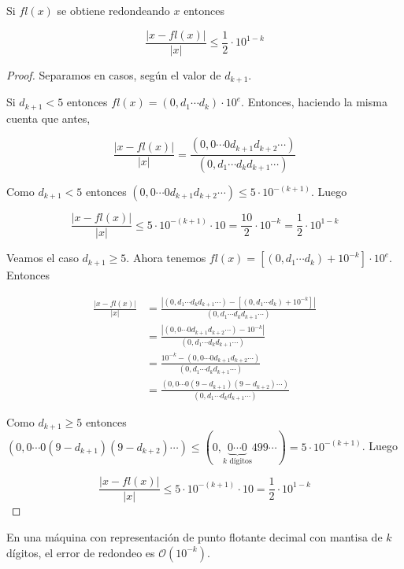 \begin{propo}
\label{propo:er}
Si $fl(x)$ se obtiene redondeando $x$ entonces

\[\frac{|x - fl(x)|}{|x|} \leq \frac{1}{2} \cdot 10^{1 - k}\]

\begin{proof}
Separamos en casos, según el valor de $d_{k + 1}$.

Si $d_{k + 1} < 5$ entonces $fl(x) = (0,d_1 \cdots d_k) \cdot 10^e$. Entonces, haciendo la misma cuenta que antes,

\[\frac{|x - fl(x)|}{|x|} = \frac{(0,0\cdots 0 d_{k + 1} d_{k + 2} \cdots )}{(0,d_1 \cdots d_k d_{k + 1} \cdots)}\]

Como $d_{k + 1} < 5$ entonces $(0,0\cdots 0 d_{k + 1} d_{k + 2} \cdots) \leq 5 \cdot 10^{-(k + 1)}$. Luego

\[\frac{|x - fl(x)|}{|x|} \leq 5 \cdot 10^{-(k + 1)} \cdot 10 = \frac{10}{2} \cdot 10^{-k} = \frac{1}{2} \cdot 10^{1 - k}\]

Veamos el caso $d_{k + 1} \geq 5$. Ahora tenemos $fl(x) = [(0, d_1 \cdots d_k) + 10^{-k}] \cdot 10^e$. Entonces

\begin{align*}
\frac{|x - fl(x)|}{|x|} &= \frac{|(0,d_1\cdots d_k d_{k + 1}\cdots) - [(0,d_1\cdots d_k) + 10^{-k}]|}{(0,d_1\cdots d_k d_{k + 1} \cdots)}\\
&= \frac{|(0,0\cdots 0d_{k + 1}d_{k + 2}\cdots) - 10^{-k}|}{(0,d_1\cdots d_k d_{k + 1} \cdots)}\\
&= \frac{10^{-k} - (0,0\cdots 0d_{k + 1}d_{k + 2}\cdots)}{(0,d_1\cdots d_k d_{k + 1} \cdots)}\\
&= \frac{(0,0\cdots 0(9 - d_{k + 1})(9 - d_{k + 2}) \cdots)}{(0,d_1\cdots d_k d_{k + 1} \cdots)}
\end{align*}

Como $d_{k + 1} \geq 5$ entonces $(0,0\cdots 0(9 - d_{k + 1})(9 - d_{k + 2}) \cdots ) \leq (0,\underbrace{0\cdots 0}_{k \text{ dígitos}}499\cdots) = 5 \cdot 10^{-(k + 1)}$. Luego

\[\frac{|x - fl(x)|}{|x|} \leq 5 \cdot 10^{-(k + 1)} \cdot 10 = \frac{1}{2} \cdot 10^{1 - k}\]

\end{proof}
\end{propo}

\begin{coro}
En una máquina con representación de punto flotante decimal con mantisa de $k$ dígitos, el error de redondeo es $\mathcal{O}(10^{-k})$.
\end{coro}

